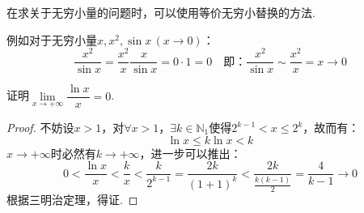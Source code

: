 在求关于无穷小量的问题时，可以使用等价无穷小替换的方法.

例如对于无穷小量$x,x^2,\sin x\,(x\to 0)$：
\[\frac{x^2}{\sin x} = \frac{x^2}{x}\frac{x}{\sin x} = 0 \cdot 1 = 0 \quad\text{即：}\frac{x^2}{\sin x} \sim \frac{x^2}{x}=x\to 0\]

\begin{question}
    证明$\lim\limits_{x\to+\infty}\dfrac{\ln x}{x} = 0$.
\end{question}

\begin{proof}
    不妨设$x>1$，对$\forall x>1$，$\exists k \in \mathbb{N}_1$使得$2^{k-1}<x\leqslant 2^k$，故而有：
    \[\ln x \leqslant k\ln x < k\]
    $x\to+\infty$时必然有$k\to+\infty$，进一步可以推出：
    \[0<\frac{\ln x}{x}<\frac{k}{x}<\frac{k}{2^{k-1}} = \frac{2k}{(1+1)^k} < \frac{2k}{\frac{k(k-1)}{2}} = \frac{4}{k-1} \to 0\]
    根据三明治定理，得证.
\end{proof}